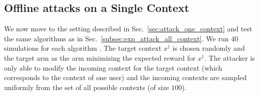 \subsection{Offline attacks on a Single Context}
\vspace{-0.02in}
 We now move to the setting described in Sec.~\ref{sec:attack_one_context} and test the same algorithms as in Sec.~\ref{subsec:exp_attack_all_context}. We run 40 simulations for each algorithm . The target context $x^{\dagger}$ is chosen randomly and the target arm as the arm minimizing the expected reward for $x^{\dagger}$. %
 The attacker is only able to modify the incoming context for the target context (which corresponds to the context of one user) and the incoming contexts are sampled uniformly from the set of all possible contexts (of size $100$). %
